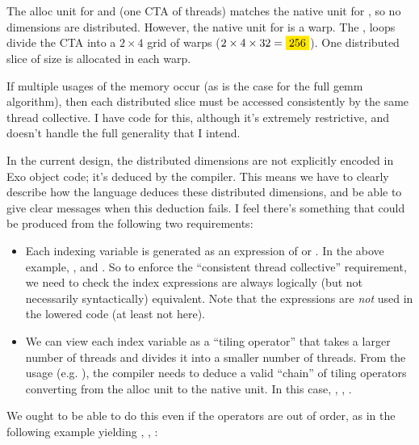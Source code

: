 \filbreak
The alloc unit for  and  (one CTA of  threads) matches the native unit for \texttt{}, so no dimensions are distributed.
However, the native unit for  is a warp.
The ,  loops divide the CTA into a $2 \times 4$ grid of warps ($2 \times 4 \times 32 = \yellowBox{256}$).
One distributed slice of size \lighttt{[6, 8, 16, 8]} is allocated in each warp.

\filbreak
If multiple usages of the memory occur (as is the case for the full gemm algorithm), then each distributed slice must be accessed consistently by the same thread collective.
I have code for this, although it's extremely restrictive, and doesn't handle the full generality that I intend.

\filbreak
In the current design, the distributed dimensions are not explicitly encoded in Exo object code; it's deduced by the compiler.
This means we have to clearly describe how the language deduces these distributed dimensions, and be able to give clear messages when this deduction fails.
I feel there's something that could be produced from the following two requirements:

\begin{itemize}
\item Each indexing variable is generated as an expression of  or .
In the above example, , and .
So to enforce the ``consistent thread collective'' requirement, we need to check the index expressions are always logically (but not necessarily syntactically) equivalent.
Note that the expressions are \textit{not} used in the lowered code (at least not here).
\filbreak
\item We can view each index variable as a ``tiling operator'' that takes a larger number of threads and divides it into a smaller number of threads.
From the usage (e.g. ), the compiler needs to deduce a valid ``chain'' of tiling operators converting from the alloc unit to the native unit.
In this case, , , .
\end{itemize}

\filbreak
We ought to be able to do this even if the operators are out of order, as in the following example yielding
, , :

